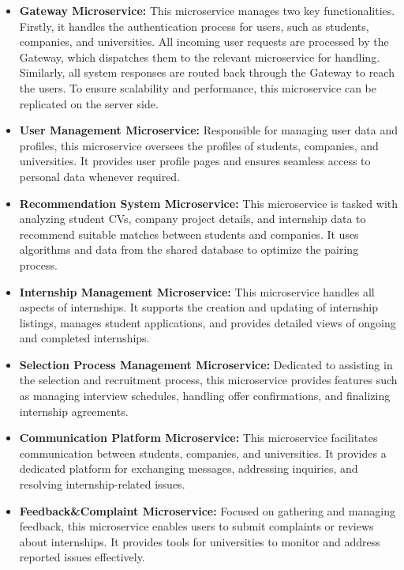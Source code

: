 \begin{itemize}
    \item \textbf{Gateway Microservice:} This microservice manages two key functionalities. Firstly, it handles the authentication process for users, such as students, companies, and universities. All incoming user requests are processed by the Gateway, which dispatches them to the relevant microservice for handling. Similarly, all system responses are routed back through the Gateway to reach the users. To ensure scalability and performance, this microservice can be replicated on the server side.

    \item \textbf{User Management Microservice:} Responsible for managing user data and profiles, this microservice oversees the profiles of students, companies, and universities. It provides user profile pages and ensures seamless access to personal data whenever required.

    \item \textbf{Recommendation System Microservice:} This microservice is tasked with analyzing student CVs, company project details, and internship data to recommend suitable matches between students and companies. It uses algorithms and data from the shared database to optimize the pairing process.

    \item \textbf{Internship Management Microservice:} This microservice handles all aspects of internships. It supports the creation and updating of internship listings, manages student applications, and provides detailed views of ongoing and completed internships.

    \item \textbf{Selection Process Management Microservice:} Dedicated to assisting in the selection and recruitment process, this microservice provides features such as managing interview schedules, handling offer confirmations, and finalizing internship agreements.

    \item \textbf{Communication Platform Microservice:} This microservice facilitates communication between students, companies, and universities. It provides a dedicated platform for exchanging messages, addressing inquiries, and resolving internship-related issues.

    \item \textbf{Feedback\&Complaint Microservice:} Focused on gathering and managing feedback, this microservice enables users to submit complaints or reviews about internships. It provides tools for universities to monitor and address reported issues effectively.


\end{itemize}
